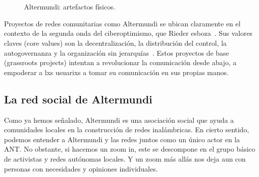 \begin{figure}[tb]
\centering
{} \quad
{} \\
 \quad
{} \\
 \quad
{}
\caption[A number of pictures.]{Altermundi: artefactos físicos.} %
\label{fig:esempio}
\end{figure}

Proyectos de redes comunitarias como Altermundi se ubican claramente en el contexto de la segunda onda del ciberoptimismo, que Rieder esboza~\autocite{Rieder2012}.
Sus valores claves (core values) son la decentralización, la distribución del control, la autogovernanza y la organización sin jerarquías~\autocite{FiTre2015}.
Estos proyectos de base (grassroots projects) intentan a revolucionar la comunicación desde abajo, a empoderar a lxs usuarixs a tomar su comunicación en sus propias manos.

\begin{comment}
* community network projects: are to be found in the context of (2nd wave) cyber optimism: "decentralization", "distributed control", "self-governance", "non-hierarchical organization"
an attempt at a capillary revolution -> ist es erfolgreich?
\end{comment}


\subsection{La red social de Altermundi}

Como ya hemos señalado, Altermundi es una asociación social que ayuda a comunidades locales en la construcción de redes inalámbricas.
En cierto sentido, podemos entender a Altermundi y las redes juntos como un único actor en la ANT.
No obstante, si hacemos un zoom in, este se descompone en el grupo básico de activistas y redes autónomas locales.
Y un zoom más allás nos deja aun con personas con necesidades y opiniones individuales.

